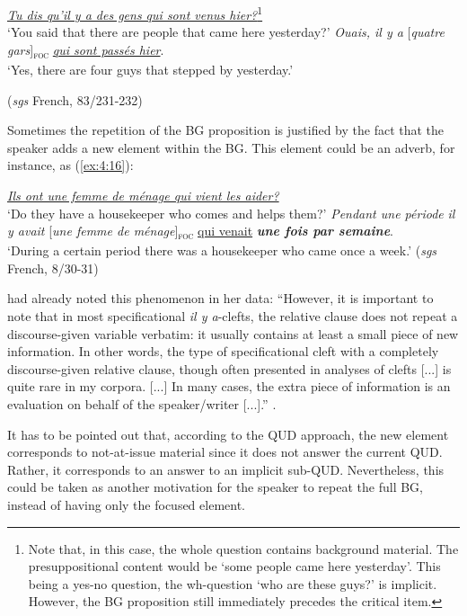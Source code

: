 \ea \label{ex:4:15}
\ea \uline{\textit{Tu dis qu'il y a des gens qui sont venus hier?}}\footnote{Note that, in this case, the whole question contains background material. The presuppositional content would be `some people came here yesterday'. This being a yes-no question, the wh-question `who are these guys?' is implicit. However, the BG proposition still immediately precedes the critical item.}\\
 ‘You said that there are people that came here yesterday?'
\ex  \textit{Ouais, il y a} {[\textit{quatre gars}]\textsubscript{\textsc{foc}}} \uline{\textit{qui sont passés hier}}\normalsize.\\
‘Yes, there are four guys that stepped by yesterday.' 

\hfill (\textit{sgs} French, 83/231-232)    
\z \z


 Sometimes the repetition of the BG proposition is justified by the fact that the speaker adds a new element within the BG. This element could be an adverb, for instance, as (\ref{ex:4:16}):

\ea \label{ex:4:16}
\ea	\uline{\textit{Ils ont une femme de ménage qui vient les aider?}}\\
 `Do they have a housekeeper who comes and helps them?'
\ex \textit{Pendant une période }\textit{il y avait} {[\textit{une femme de ménage}]\textsubscript{\textsc{foc}}} \normalsize \uline{qui venait} \textit{\textbf{une fois par semaine}}.\\
`During a certain period there was a housekeeper who came once a week.' \hfill (\textit{sgs} French, 8/30-31)    
\z \z


\textcite{karssenberg2017oiseaux} had already noted this phenomenon in her data: ``However, it is important to note that in most specificational \textit{il y a}-clefts, the relative clause does not repeat a discourse-given variable verbatim: it usually contains at least a small piece of new information. In other words, the type of specificational cleft with a completely discourse-given relative clause, though often presented in analyses of clefts [...] is quite rare in my corpora. [...] In many cases, the extra piece of information is an evaluation on behalf of the speaker/writer [...].” \parencite[251]{karssenberg2017oiseaux}. 

It has to be pointed out that, according to the QUD approach, the new element corresponds to not-at-issue material since it does not answer the current QUD. Rather, it corresponds to an answer to an implicit sub-QUD. Nevertheless, this could be taken as another motivation for the speaker to repeat the full BG, instead of having only the focused element.

